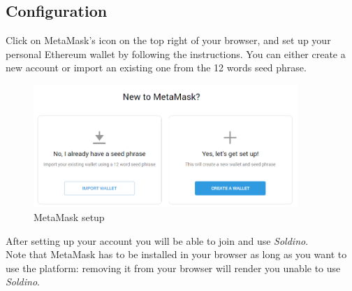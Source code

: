 	\subsection{Configuration}
	Click on MetaMask's icon on the top right of your browser, and set up your 
	personal Ethereum wallet by following the instructions. You can either 
	create a new account or import an existing one from the 12 words seed phrase.
	\begin{figure}[H]
		\includegraphics[width=10cm]{res/images/metamask_select.png}
		\centering
		\caption{MetaMask setup}
	\end{figure}
	\noindent After setting up your account you will be able to join and use 
	\textit{Soldino}.
	\newline \\
	Note that MetaMask has to be installed in your browser as long as you want 
	to use the platform: removing it from your browser will render you unable 
	to use \textit{Soldino}.
